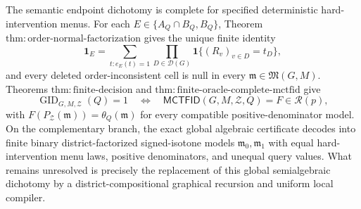 The semantic endpoint dichotomy is complete for specified deterministic hard-intervention menus.  For each \(E\in\{A_Q\cap B_Q,B_Q\}\), Theorem \(\mathrm{thm:order\text{-}normal\text{-}factorization}\) gives the unique finite identity
\[
 \mathbf 1_E
 =\sum_{t:e_E(t)=1}\prod_{D\in\mathcal D(G)}
   \mathbf 1\{(R_v)_{v\in D}=t_D\},
\]
and every deleted order-inconsistent cell is null in every \(\mathfrak m\in\mathfrak M(G,M)\).  Theorems \(\mathrm{thm:finite\text{-}decision}\) and \(\mathrm{thm:finite\text{-}oracle\text{-}complete\text{-}mctfid}\) give
\[
 \operatorname{GID}_{G,M,\mathcal Z}(Q)=1
 \quad\Longleftrightarrow\quad
 \mathsf{MCTFID}(G,M,\mathcal Z,Q)=F\in\mathcal R(p),
\]
with \(F(P_{\mathcal Z}(\mathfrak m))=\theta_Q(\mathfrak m)\) for every compatible positive-denominator model.  On the complementary branch, the exact global algebraic certificate decodes into finite binary district-factorized signed-isotone models \(\mathfrak m_0,\mathfrak m_1\) with equal hard-intervention menu laws, positive denominators, and unequal query values.  What remains unresolved is precisely the replacement of this global semialgebraic dichotomy by a district-compositional graphical recursion and uniform local compiler.